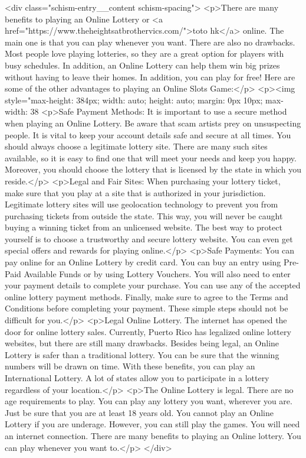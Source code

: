 {		<div class="schism-entry__content schism-spacing">			<p>There are many benefits to playing an Online Lottery or <a href="https://www.theheightsatbrothervics.com/">toto hk</a> online. The main one is that you can play whenever you want. There are also no drawbacks. Most people love playing lotteries, so they are a great option for players with busy schedules. In addition, an Online Lottery can help them win big prizes without having to leave their homes. In addition, you can play for free! Here are some of the other advantages to playing an Online Slots Game:</p>
<p><img style="max-height: 384px; width: auto; height: auto; margin: 0px 10px; max-width: 38%
<p>Safe Payment Methods: It is important to use a secure method when playing an Online Lottery. Be aware that scam artists prey on unsuspecting people. It is vital to keep your account details safe and secure at all times. You should always choose a legitimate lottery site. There are many such sites available, so it is easy to find one that will meet your needs and keep you happy. Moreover, you should choose the lottery that is licensed by the state in which you reside.</p>
<p>Legal and Fair Sites: When purchasing your lottery ticket, make sure that you play at a site that is authorized in your jurisdiction. Legitimate lottery sites will use geolocation technology to prevent you from purchasing tickets from outside the state. This way, you will never be caught buying a winning ticket from an unlicensed website. The best way to protect yourself is to choose a trustworthy and secure lottery website. You can even get special offers and rewards for playing online.</p>
<p>Safe Payments: You can pay online for an Online Lottery by credit card. You can buy an entry using Pre-Paid Available Funds or by using Lottery Vouchers. You will also need to enter your payment details to complete your purchase. You can use any of the accepted online lottery payment methods. Finally, make sure to agree to the Terms and Conditions before completing your payment. These simple steps should not be difficult for you.</p>
<p>Legal Online Lottery. The internet has opened the door for online lottery sales. Currently, Puerto Rico has legalized online lottery websites, but there are still many drawbacks. Besides being legal, an Online Lottery is safer than a traditional lottery. You can be sure that the winning numbers will be drawn on time. With these benefits, you can play an International Lottery. A lot of states allow you to participate in a lottery regardless of your location.</p>
<p>The Online Lottery is legal. There are no age requirements to play. You can play any lottery you want, wherever you are. Just be sure that you are at least 18 years old. You cannot play an Online Lottery if you are underage. However, you can still play the games. You will need an internet connection. There are many benefits to playing an Online lottery. You can play whenever you want to.</p>
		</div>

}
